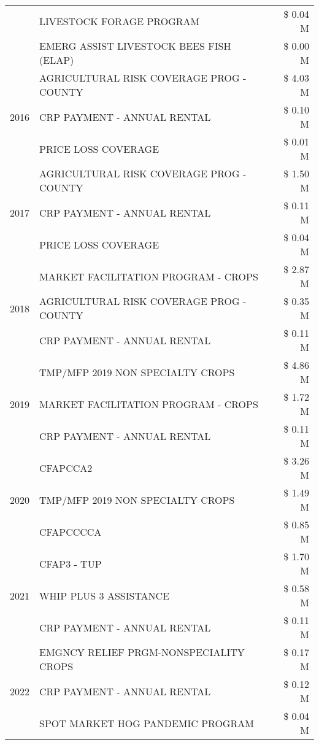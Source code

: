 \begin{tabular}{llr}
 & LIVESTOCK FORAGE PROGRAM & \$ 0.04 M \\
 & EMERG ASSIST LIVESTOCK BEES FISH (ELAP) & \$ 0.00 M \\
\cline{1-3}
\multirow[t]{3}{*}{2016} & AGRICULTURAL RISK COVERAGE PROG - COUNTY & \$ 4.03 M \\
 & CRP PAYMENT - ANNUAL RENTAL & \$ 0.10 M \\
 & PRICE LOSS COVERAGE & \$ 0.01 M \\
\cline{1-3}
\multirow[t]{3}{*}{2017} & AGRICULTURAL RISK COVERAGE PROG - COUNTY & \$ 1.50 M \\
 & CRP PAYMENT - ANNUAL RENTAL & \$ 0.11 M \\
 & PRICE LOSS COVERAGE & \$ 0.04 M \\
\cline{1-3}
\multirow[t]{3}{*}{2018} & MARKET FACILITATION PROGRAM - CROPS & \$ 2.87 M \\
 & AGRICULTURAL RISK COVERAGE PROG - COUNTY & \$ 0.35 M \\
 & CRP PAYMENT - ANNUAL RENTAL & \$ 0.11 M \\
\cline{1-3}
\multirow[t]{3}{*}{2019} & TMP/MFP 2019 NON SPECIALTY CROPS & \$ 4.86 M \\
 & MARKET FACILITATION PROGRAM - CROPS & \$ 1.72 M \\
 & CRP PAYMENT - ANNUAL RENTAL & \$ 0.11 M \\
\cline{1-3}
\multirow[t]{3}{*}{2020} & CFAPCCA2 & \$ 3.26 M \\
 & TMP/MFP 2019 NON SPECIALTY CROPS & \$ 1.49 M \\
 & CFAPCCCCA & \$ 0.85 M \\
\cline{1-3}
\multirow[t]{3}{*}{2021} & CFAP3 - TUP & \$ 1.70 M \\
 & WHIP PLUS 3 ASSISTANCE & \$ 0.58 M \\
 & CRP PAYMENT - ANNUAL RENTAL & \$ 0.11 M \\
\cline{1-3}
\multirow[t]{3}{*}{2022} & EMGNCY RELIEF PRGM-NONSPECIALITY CROPS & \$ 0.17 M \\
 & CRP PAYMENT - ANNUAL RENTAL & \$ 0.12 M \\
 & SPOT MARKET HOG PANDEMIC PROGRAM & \$ 0.04 M \\
\cline{1-3}
\bottomrule
\end{tabular}
